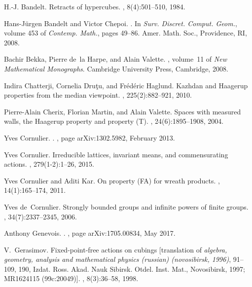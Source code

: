 \documentclass[a4paper]{article}
\theoremstyle{definition}
\begin{document}
\begin{thebibliography}{10}

H.-J. Bandelt.
\newblock Retracts of hypercubes.
, 8(4):501--510, 1984.

Hans-J{\"{u}}rgen Bandelt and Victor Chepoi.
.
\newblock In {\em Surv. Discret. Comput. Geom.}, volume 453 of {\em Contemp.
  Math.}, pages 49--86. Amer. Math. Soc., Providence, RI, 2008.

Bachir Bekka, Pierre de~la Harpe, and Alain Valette.
, volume~11 of {\em New Mathematical
  Monographs}.
\newblock Cambridge University Press, Cambridge, 2008.

Indira Chatterji, Cornelia Dru\c{t}u, and Fr\'{e}d\'{e}ric Haglund.
\newblock Kazhdan and {H}aagerup properties from the median viewpoint.
, 225(2):882--921, 2010.

Pierre-Alain Cherix, Florian Martin, and Alain Valette.
\newblock Spaces with measured walls, the {H}aagerup property and property
  ({T}).
, 24(6):1895--1908, 2004.

Yves {Cornulier}.
.
, page arXiv:1302.5982, February 2013.

Yves Cornulier.
\newblock Irreducible lattices, invariant means, and commensurating actions.
, 279(1-2):1--26, 2015.

Yves Cornulier and Aditi Kar.
\newblock On property ({FA}) for wreath products.
, 14(1):165--174, 2011.

Yves de~Cornulier.
\newblock Strongly bounded groups and infinite powers of finite groups.
, 34(7):2337--2345, 2006.

Anthony {Genevois}.
.
, page arXiv:1705.00834, May 2017.

V.~Gerasimov.
\newblock Fixed-point-free actions on cubings [translation of {\it {a}lgebra,
  geometry, analysis and mathematical physics ({r}ussian) ({n}ovosibirsk,
  1996)}, 91--109, 190, {I}zdat. {R}oss. {A}kad. {N}auk {S}ibirsk. {O}tdel.
  {I}nst. {M}at., {N}ovosibirsk, 1997; {MR}1624115 (99c:20049)].
, 8(3):36--58, 1998.


\end{thebibliography}
\end{document}
